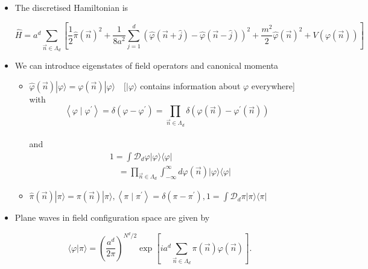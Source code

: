 \begin{itemize}
  \item The discretised Hamiltonian is


\begin{equation}
\hat{H}=a^{d} \sum_{\vec n \in \Lambda_{d}}\left[\frac{1}{2} \hat{\pi}(\vec{n})^{2}+\frac{1}{8 a^{2}} \sum_{j=1}^{d}(\hat{\varphi}(\vec{n}+\hat{j})-\hat{\varphi}(\vec{n}-\hat{j}))^{2}+\frac{m^{2}}{2} \hat{\varphi}(\vec{n})^{2}+V(\varphi(\vec{n}))\right]
\end{equation}


  \item We can introduce eigenstates of field operators and canonical momenta\\
\begin{itemize}
     \item\(\hat{\varphi}(\vec{n})|\varphi\rangle=\varphi(\vec{n})|\varphi\rangle \quad[| \varphi\rangle\) contains information about \(\varphi\) everywhere]\\
with \begin{equation}\left\langle\varphi \mid \varphi^{\prime}\right\rangle=\delta\left(\varphi-\varphi^{\prime}\right)=\prod_{\vec{n} \in \Lambda_{d}} \delta\left(\varphi(\vec{n})-\varphi^{\prime}(\vec{n})\right)\end{equation}\\
and
\begin{equation}
\begin{aligned}
& 1=\int \mathcal{D}_{d} \varphi|\varphi\rangle\langle\varphi| \\
& \quad=\prod_{\vec{n} \in \Lambda_{d}} \int_{-\infty}^{\infty} d \varphi(\vec{n})|\varphi\rangle\langle\varphi|
\end{aligned}
\end{equation}


  \item \(\hat{\pi}(\vec{n})|\pi\rangle=\pi(\vec{n})|\pi\rangle,\left\langle\pi \mid \pi^{\prime}\right\rangle=\delta\left(\pi-\pi^{\prime}\right), 1=\int \mathcal{D}_{d} \pi|\pi\rangle\langle\pi|\)
  
\end{itemize} 
  \item Plane waves in field configuration space are given by

\begin{equation}
\langle\varphi | \pi\rangle=\left(\frac{a^{d}}{2 \pi}\right)^{N^d / 2} \exp \left[i a^{d} \sum_{\vec{n} \in \Lambda_{d}} \pi(\vec{n}) \varphi(\vec{n})\right].
\end{equation}


\end{itemize}
